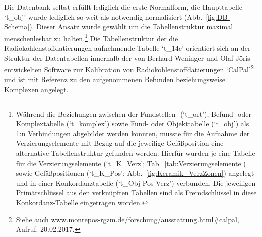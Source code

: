 Die Datenbank selbst erfüllt lediglich die erste Normalform, die Haupttabelle \enquote*{t\_obj} wurde lediglich so weit als notwendig normalisiert (Abb.~\ref{fig:DB-Schema}). Dieser Ansatz wurde gewählt um die Tabellenstruktur maximal menschenlesbar zu halten.\footnote{Während die Beziehungen zwischen der Fundstellen- (\enquote*{t\_ort}), Befund- oder Komplextabelle (\enquote*{t\_komplex}) sowie Fund- oder Objekttabelle (\enquote*{t\_obj}) als 1:n Verbindungen abgebildet werden konnten, musste für die Aufnahme der Verzierungselemente mit Bezug auf die jeweilige Gefäßposition eine alternative Tabellenstruktur gefunden werden. Hierfür wurden je eine Tabelle für die Verzierungselemente (\enquote*{t\_K\_Verz}; Tab.~\ref{tab:Verzierungselemente}) sowie Gefäßpositionen (\enquote*{t\_K\_Pos}; Abb.~\ref{fig:Keramik_VerzZonen}) angelegt und in einer Konkordanztabelle (\enquote*{t\_Obj-Pos-Verz}) verbunden. Die jeweiligen Primärschlüssel aus den verknüpften Tabellen sind als Fremdschlüssel in diese Konkordanz-Tabelle eingetragen worden.} Die Tabellenstruktur der die Radiokohlenstoffdatierungen aufnehmende Tabelle \enquote*{t\_14c} orientiert sich an der Struktur der Datentabellen innerhalb der von Berhard Weninger und Olaf Jöris entwickelten Software zur Kalibration von Radiokohlenstoffdatierungen \enquote*{CalPal}\footnote{Siehe auch \url{www.monrepos-rgzm.de/forschung/ausstattung.html\#calpal}, Aufruf: 20.02.2017.} und ist mit Referenz zu den aufgenommenen Befunden beziehungsweise Komplexen angelegt.

